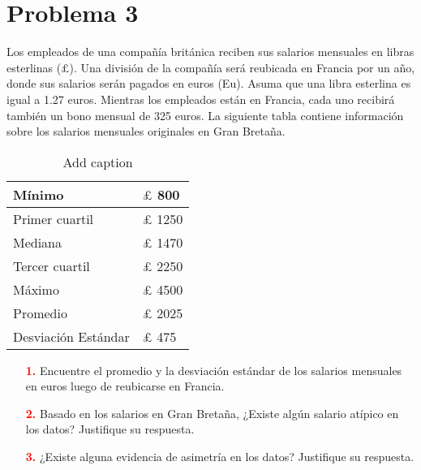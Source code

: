 \documentclass[11pt,letterpaper]{report}
\newcommand{\caja}[1]{\begin{center}
\shadowbox{
\begin{minipage}{6in}
\vspace*{1mm}
#1
\vspace*{1mm}
\end{minipage}}\end{center}}
\begin{document}
\section*{Problema 3}
Los empleados de una compañía británica reciben sus salarios mensuales en libras esterlinas ($ \pounds
$). Una
división de la compañía será reubicada en Francia por un año, donde sus salarios serán pagados en euros
(Eu). Asuma que una libra esterlina es igual a 1.27 euros. Mientras los empleados están en Francia, cada uno
recibirá también un bono mensual de 325 euros.
La siguiente tabla contiene información sobre los salarios mensuales originales en Gran Bretaña.
\begin{table}[htbp]
	\centering
	\caption{Add caption}
	\begin{tabular}{|l|l|}
		\toprule
		Mínimo  & 
		$\pounds$ 800 \\
		\midrule
		Primer cuartil &  $\pounds$ 1250 \\
		\midrule
		Mediana  & $\pounds$ 1470 \\
		\midrule
		Tercer cuartil  & $\pounds$ 2250 \\
		\midrule
		Máximo  & $\pounds$ 4500 \\
		\midrule
		Promedio  & $\pounds$ 2025 \\
		\midrule
		Desviación Estándar & $\pounds$ 475 \\
		\bottomrule
	\end{tabular}%
	\label{tab:addlabel}%
\end{table}%
\begin{enumerate}
	\item[\textcolor{red}{\bf{1.}}]  Encuentre el promedio y la desviación estándar de los salarios mensuales en euros luego de reubicarse en
	Francia.
	\item[\textcolor{red}{\bf{2.}}]  Basado en los salarios en Gran Bretaña, ¿Existe algún salario atípico en los datos? Justifique su respuesta.
	\item[\textcolor{red}{\bf{3.}}] ¿Existe alguna evidencia de asimetría en los datos? Justifique su respuesta.
\end{enumerate}
	
\end{document}
